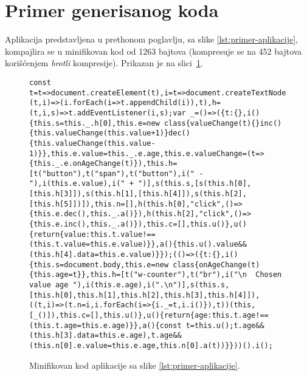 \section{Primer generisanog koda}

Aplikacija predstavljena u prethonom poglavlju, sa slike \ref{lst:primer-aplikacije}, kompajlira se u minifikovan kod od 1263 bajtova (kompresuje se na 452 bajtova korišćenjem \textsl{brotli} kompresije).
Prikazan je na slici~\ref{lst:min-code}.

\begin{figure}
	\begin{lstlisting}[breaklines=true,breakindent=0pt,columns=fullflexible]
    const t=t=>document.createElement(t),i=t=>document.createTextNode(t),s=(t,i)=>(i.forEach(i=>t.appendChild(i)),t),h=(t,i,s)=>t.addEventListener(i,s);var _=()=>({t:{},i(){this.s=this._.h[0],this.e=new class{valueChange(t){}inc(){this.valueChange(this.value+1)}dec(){this.valueChange(this.value-1)}},this.e.value=this._.e.age,this.e.valueChange=(t=>{this._.e.onAgeChange(t)}),this.h=[t("button"),t("span"),t("button"),i(" - "),i(this.e.value),i(" + ")],s(this.s,[s(this.h[0],[this.h[3]]),s(this.h[1],[this.h[4]]),s(this.h[2],[this.h[5]])]),this.n=[],h(this.h[0],"click",()=>{this.e.dec(),this._.a()}),h(this.h[2],"click",()=>{this.e.inc(),this._.a()}),this.c=[],this.u()},u(){return{value:this.t.value!==(this.t.value=this.e.value)}},a(){this.u().value&&(this.h[4].data=this.e.value)}});(()=>({t:{},i(){this.s=document.body,this.e=new class{onAgeChange(t){this.age=t}},this.h=[t("w-counter"),t("br"),i("\n  Chosen value age "),i(this.e.age),i(".\n")],s(this.s,[this.h[0],this.h[1],this.h[2],this.h[3],this.h[4]]),((t,i)=>(t.n=i,i.forEach(i=>{i._=t,i.i()}),t))(this,[_()]),this.c=[],this.u()},u(){return{age:this.t.age!==(this.t.age=this.e.age)}},a(){const t=this.u();t.age&&(this.h[3].data=this.e.age),t.age&&(this.n[0].e.value=this.e.age,this.n[0].a(t))}}))().i();
	\end{lstlisting}
  \caption{Minifikovan kod aplikacije sa slike \ref{lst:primer-aplikacije}.}
  \label{lst:min-code}
\end{figure}
